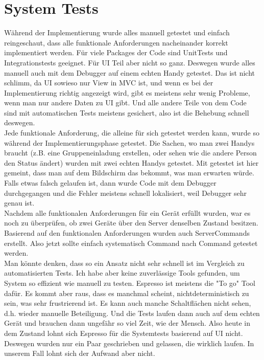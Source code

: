 \documentclass[11pt,a4paper]{scrartcl}
\begin{document}
\newpage

\section{System Tests}

Während der Implementierung wurde alles manuell getestet und einfach reingeschaut, dass alle funktionale Anforderungen nacheinander korrekt implementiert werden. Für viele Packages der Code sind UnitTests und Integrationstests geeignet. Für UI Teil aber nicht so ganz. Deswegen wurde alles manuell auch mit dem Debugger auf einem echten Handy  getestet. Das ist nicht schlimm, da UI sowieso nur View in MVC ist, und wenn es bei der Implementierung richtig angezeigt wird, gibt es meistens sehr wenig Probleme, wenn man nur andere Daten zu UI gibt. Und alle andere Teile von dem Code sind mit automatischen Tests meistens gesichert, also ist die Behebung schnell deswegen.\\

Jede funktionale Anforderung, die alleine für sich getestet werden kann, wurde so während der Implementierungsphase getestet. Die Sachen, wo man zwei Handys braucht (z.B. eine Gruppeneinladung erstellen, oder sehen wie die andere Person den Status ändert) wurden mit zwei echten Handys getestet. Mit getestet ist hier gemeint, dass man auf dem Bildschirm das bekommt, was man erwarten würde. Falls etwas falsch gelaufen ist, dann wurde Code mit dem Debugger durchgegangen und die Fehler meistens schnell lokalisiert, weil Debugger sehr genau ist.\\

Nachdem alle funktionalen Anforderungen für ein Gerät erfüllt wurden, war es noch zu überprüfen, ob zwei Geräte über den Server denselben Zustand besitzen. Basierend auf den funktionalen Anforderungen wurden auch ServerCommands erstellt. Also jetzt sollte einfach systematisch Command nach Command getestet werden. \\

Man könnte denken, dass so ein Ansatz nicht sehr schnell ist im Vergleich zu automatisierten Tests. Ich habe aber keine zuverlässige Tools gefunden, um System so effizient wie manuell zu testen. Espresso ist meistens die "To go" Tool dafür. Es kommt aber raus, dass es manchmal scheint, nichtdeterministisch zu sein, was sehr frustrierend ist. Es kann auch manche Schaltflächen nicht sehen, d.h. wieder manuelle Beteiligung. Und die Tests laufen dann auch auf dem echten Gerät und brauchen dann ungefähr so viel Zeit, wie der Mensch. Also heute in dem Zustand lohnt sich Espresso für die Systemtests basierend auf UI nicht. Deswegen wurden nur ein Paar geschrieben und gelassen, die wirklich laufen. In unserem Fall lohnt sich der Aufwand aber nicht.\\
\end{document}
